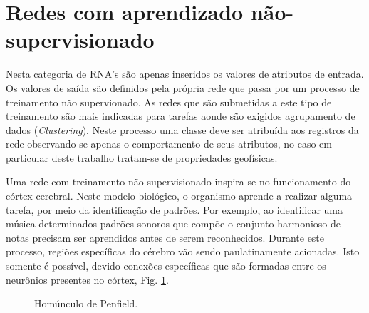 \section{Redes com aprendizado não-supervisionado}

Nesta categoria de RNA's são apenas inseridos os valores de atributos de
entrada. Os valores de saída são definidos pela própria rede que passa por um
processo de treinamento não supervionado. As redes que são submetidas a este
tipo de treinamento são mais indicadas para tarefas aonde são exigidos
agrupamento de dados (\textit{Clustering}). Neste processo uma classe deve ser
atribuída aos registros da rede observando-se apenas o comportamento de seus
atributos, no caso em particular deste trabalho tratam-se de propriedades
geofísicas.

Uma rede com treinamento não supervisionado inspira-se no funcionamento do
córtex cerebral. Neste modelo biológico, o organismo aprende a realizar alguma
tarefa, por meio da identificação de padrões. Por exemplo, ao identificar uma
música determinados padrões sonoros que compõe o conjunto harmonioso de notas
precisam ser aprendidos antes de serem reconhecidos. Durante este processo,
regiões específicas do cérebro vão sendo paulatinamente acionadas. Isto somente
é possível, devido conexões específicas que são formadas entre os neurônios
presentes no córtex, Fig. \ref{homunculo}.

\begin{figure}[H]
	\centering
	\setlength{\fboxsep}{8pt}
	\setlength{\fboxrule}{0.1pt}
	\caption{Homúnculo de Penfield.}
	\label{homunculo}
\end{figure}

